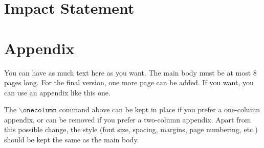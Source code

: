 \documentclass{article}
\theoremstyle{plain}
\theoremstyle{definition}
\theoremstyle{remark}
\begin{document}



\section*{Impact Statement}
\label{Imapact Statement}

\nocite{*}




\newpage
\appendix
\onecolumn
\section{Appendix}

You can have as much text here as you want. The main body must be at most $8$ pages long.
For the final version, one more page can be added.
If you want, you can use an appendix like this one.  

The $\mathtt{\backslash onecolumn}$ command above can be kept in place if you prefer a one-column appendix, or can be removed if you prefer a two-column appendix.  Apart from this possible change, the style (font size, spacing, margins, page numbering, etc.) should be kept the same as the main body.
\end{document}

